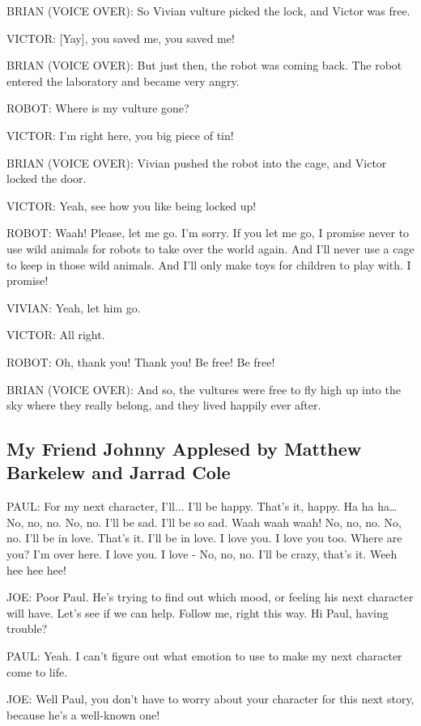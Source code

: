 BRIAN (VOICE OVER):
So Vivian vulture picked the lock, and Victor was free.

VICTOR:
[Yay], you saved me, you saved me!

BRIAN (VOICE OVER):
But just then, the robot was coming back.
The robot entered the laboratory and became very angry.

ROBOT:
Where is my vulture gone?

VICTOR:
I'm right here, you big piece of tin!

BRIAN (VOICE OVER):
Vivian pushed the robot into the cage, and Victor locked the door.

VICTOR:
Yeah, see how you like being locked up!

ROBOT:
Waah!
Please, let me go.
I'm sorry.
If you let me go, I promise never to use wild animals for robots to take over the world again.
And I'll never use a cage to keep in those wild animals.
And I'll only make toys for children to play with.
I promise!

VIVIAN:
Yeah, let him go.

VICTOR:
All right.

ROBOT:
Oh, thank you!
Thank you!
Be free!
Be free!

BRIAN (VOICE OVER):
And so, the vultures were free to fly high up into the sky where they really belong, and they lived happily ever after.

\subsection{My Friend Johnny Applesed by Matthew Barkelew and Jarrad Cole}

PAUL:
For my next character, I'll...
I'll be happy.
That's it, happy.
Ha ha ha\dots
No, no, no.
No, no.
I'll be sad.
I'll be so sad.
Waah waah waah!
No, no, no.
No, no.
I'll be in love.
That's it.
I'll be in love.
I love you.
I love you too.
Where are you?
I'm over here.
I love you.
I love -
No, no, no.
I'll be crazy, that's it.
Weeh hee hee hee!

JOE:
Poor Paul.
He's trying to find out which mood, or feeling his next character will have.
Let's see if we can help.
Follow me, right this way.
Hi Paul, having trouble?

PAUL:
Yeah.
I can't figure out what emotion to use to make my next character come to life.

JOE:
Well Paul, you don't have to worry about your character for this next story, because he's a well-known one!

